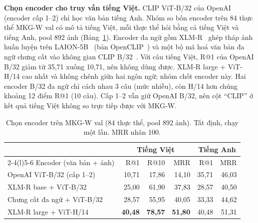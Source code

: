 \textbf{Chọn encoder cho truy vấn tiếng Việt.}\label{sec:vn-encoder} CLIP ViT-B/32 của OpenAI (encoder cấp 1--2) chỉ học văn
bản tiếng Anh. Nhóm so bốn encoder trên 84 thực thể MKG-W val có mô tả tiếng Việt, mỗi thực thể hỏi bằng cả tiếng Việt và
tiếng Anh, pool 892 ảnh (Bảng~\ref{tab:vn-encoder}). Encoder đa ngữ gồm XLM-R~\cite{vn-conneau2020xlmr} ghép tháp ảnh huấn
luyện trên LAION-5B~\cite{vn-schuhmann2022laion5b} (bản OpenCLIP~\cite{vn-ilharco2021openclip}) và một bộ mã hoá văn bản đa
ngữ chưng cất vào không gian CLIP B/32~\cite{vn-reimers2020multilingual}. Với câu tiếng Việt, R@1 của OpenAI B/32 giảm từ
35,71 xuống 10,71, nên không dùng được. XLM-R large + ViT-H/14 cao nhất và không chênh giữa hai ngôn ngữ; nhóm chốt encoder
này. Hai encoder B/32 đa ngữ chỉ cách nhau 3 câu (mức nhiễu), còn H/14 hơn chúng khoảng 12 điểm R@1 (10 câu). Cấp 1--2 vẫn
giữ OpenAI B/32, nên cột ``CLIP'' ở kết quả tiếng Việt không so trực tiếp được với MKG-W.

\begin{table}[t]
\centering
\caption{Chọn encoder trên MKG-W val (84 thực thể, pool 892 ảnh). Tất định, chạy một lần. MRR nhân 100.}
\label{tab:vn-encoder}
\footnotesize
\setlength{\tabcolsep}{3pt}
\begin{tabular}{@{}lrrrrr@{}}
\toprule
 & \multicolumn{3}{c}{Tiếng Việt} & \multicolumn{2}{c}{Tiếng Anh} \\
\cmidrule(lr){2-4}\cmidrule(l){5-6}
Encoder (văn bản + ảnh) & R@1 & R@10 & MRR & R@1 & MRR \\
\midrule
OpenAI ViT-B/32 (cấp 1--2) & 10,71 & 17,86 & 14,10 & 35,71 & 46,03 \\
XLM-R base + ViT-B/32 & 25,00 & 61,90 & 37,83 & 28,57 & 40,50 \\
Chưng cất đa ngữ + ViT-B/32 & 28,57 & 55,95 & 40,05 & 33,33 & 44,62 \\
XLM-R large + ViT-H/14 & \textbf{40,48} & \textbf{78,57} & \textbf{51,80} & 40,48 & 51,31 \\
\bottomrule
\end{tabular}
\end{table}
